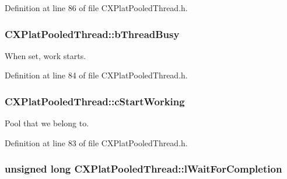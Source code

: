 \-Definition at line 86 of file \-C\-X\-Plat\-Pooled\-Thread.\-h.

\hypertarget{class_c_x_plat_pooled_thread_ae9df7cdc87ca6ebf387fb4cf42836417}{
\subsubsection[{b\-Thread\-Busy}]{ {\bf \-C\-X\-Plat\-Pooled\-Thread\-::b\-Thread\-Busy}}}\label{class_c_x_plat_pooled_thread_ae9df7cdc87ca6ebf387fb4cf42836417}


\-When set, work starts. 



\-Definition at line 84 of file \-C\-X\-Plat\-Pooled\-Thread.\-h.

\hypertarget{class_c_x_plat_pooled_thread_aa72050f5a65f4117e41aec984a976fac}{
\subsubsection[{c\-Start\-Working}]{ {\bf \-C\-X\-Plat\-Pooled\-Thread\-::c\-Start\-Working}}}\label{class_c_x_plat_pooled_thread_aa72050f5a65f4117e41aec984a976fac}


\-Pool that we belong to. 



\-Definition at line 83 of file \-C\-X\-Plat\-Pooled\-Thread.\-h.

\hypertarget{class_c_x_plat_pooled_thread_a55185bc10d6367eaaf05fbd1e6ed3701}{
\subsubsection[{l\-Wait\-For\-Completion}]{\setlength{\rightskip}{0pt plus 5cm}unsigned long {\bf \-C\-X\-Plat\-Pooled\-Thread\-::l\-Wait\-For\-Completion}}}\label{class_c_x_plat_pooled_thread_a55185bc10d6367eaaf05fbd1e6ed3701}


